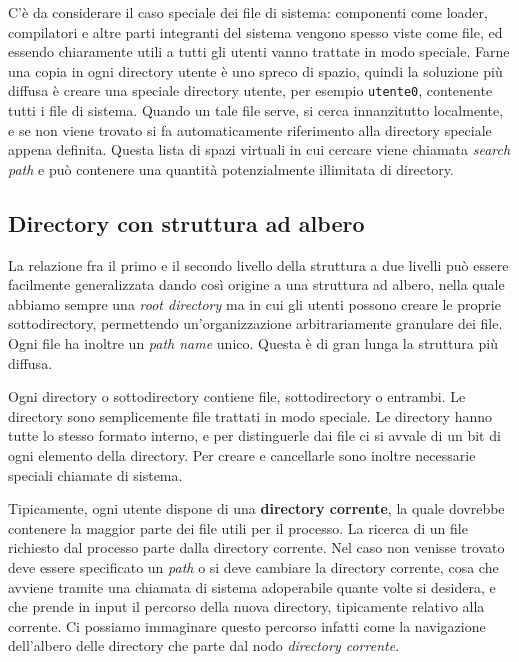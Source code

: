        C'è da considerare il caso speciale dei file di sistema: componenti come loader, compilatori e altre parti integranti del sistema vengono spesso viste come file, ed essendo chiaramente utili a tutti gli utenti vanno trattate in modo speciale. Farne una copia in ogni directory utente è uno spreco di spazio, quindi la soluzione più diffusa è creare una speciale directory utente, per esempio \texttt{utente0}, contenente tutti i file di sistema. Quando un tale file serve, si cerca innanzitutto localmente, e se non viene trovato si fa automaticamente riferimento alla directory speciale appena definita. Questa lista di spazi virtuali in cui cercare viene chiamata \textit{search path} e può contenere una quantità potenzialmente illimitata di directory.
        
    \subsection{Directory con struttura ad albero}
        La relazione fra il primo e il secondo livello della struttura a due livelli può essere facilmente generalizzata dando così origine a una struttura ad albero, nella quale abbiamo sempre una \textit{root directory} ma in cui gli utenti possono creare le proprie sottodirectory, permettendo un'organizzazione arbitrariamente granulare dei file. Ogni file ha inoltre un \textit{path name} unico. Questa è di gran lunga la struttura più diffusa.
        
        Ogni directory o sottodirectory contiene file, sottodirectory o entrambi. Le directory sono semplicemente file trattati in modo speciale. Le directory hanno tutte lo stesso formato interno, e per distinguerle dai file ci si avvale di un bit di ogni elemento della directory. Per creare e cancellarle sono inoltre necessarie speciali chiamate di sistema.
        
        Tipicamente, ogni utente dispone di una \textbf{directory corrente}, la quale dovrebbe contenere la maggior parte dei file utili per il processo. La ricerca di un file richiesto dal processo parte dalla directory corrente. Nel caso non venisse trovato deve essere specificato un \textit{path} o si deve cambiare la directory corrente, cosa che avviene tramite una chiamata di sistema adoperabile quante volte si desidera, e che prende in input il percorso della nuova directory, tipicamente relativo alla corrente. Ci possiamo immaginare questo percorso infatti come la navigazione dell'albero delle directory che parte dal nodo \textit{directory corrente}.
        
